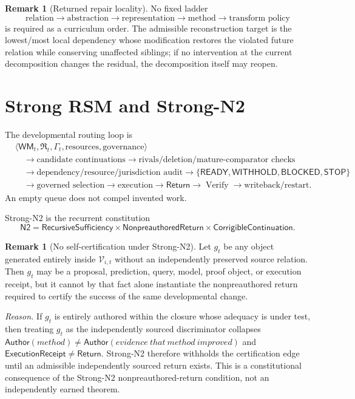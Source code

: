 \documentclass[10pt]{article}
\theoremstyle{venus}
\theoremstyle{definition}
\newtheorem{remark}[theorem]{Remark}
\newcommand{\Verify}{\operatorname{Verify}}
\newcommand{\Ntwo}{\mathsf{N2}}
\newcommand{\WM}{\mathsf{WM}}
\newcommand{\Return}{\mathsf{Return}}
\newcommand{\Author}{\mathsf{Author}}
\newcommand{\Withhold}{\mathsf{WITHHOLD}}
\newcommand{\Stop}{\mathsf{STOP}}
\begin{document}
\begin{remark}[Returned repair locality]
No fixed ladder
\[
\text{relation}\to\text{abstraction}\to\text{representation}\to\text{method}
\to\text{transform policy}
\]
is required as a curriculum order. The admissible reconstruction target is the
lowest/most local dependency whose modification restores the violated future
relation while conserving unaffected siblings; if no intervention at the
current decomposition changes the residual, the decomposition itself may
reopen.
\end{remark}

\section{Strong RSM and Strong-N2}

The developmental routing loop is
\begin{equation}\label{eq:rsm}
\begin{aligned}
&\langle \WM_t,\mathfrak R_t,\Gamma_t,\text{resources},\text{governance}\rangle\\
&\quad\to \text{candidate continuations}
\to \text{rivals/deletion/mature-comparator checks}\\
&\quad\to \text{dependency/resource/jurisdiction audit}
\to \{\mathsf{READY},\Withhold,\mathsf{BLOCKED},\Stop\}\\
&\quad\to \text{governed selection}
\to \text{execution}
\to \Return
\to \Verify
\to \text{writeback/restart}.
\end{aligned}
\end{equation}
An empty queue does not compel invented work.

Strong-N2 is the recurrent constitution
\begin{equation}\label{eq:n2}
\boxed{
\Ntwo
=
\mathsf{RecursiveSufficiency}
\times
\mathsf{NonpreauthoredReturn}
\times
\mathsf{CorrigibleContinuation}.
}
\end{equation}

\begin{remark}[No self-certification under Strong-N2]
Let $g_t$ be any object generated entirely inside $\mathcal V_{i,t}$ without an
independently preserved source relation. Then $g_t$ may be a proposal,
prediction, query, model, proof object, or execution receipt, but it cannot by
that fact alone instantiate the nonpreauthored return required to certify the
success of the same developmental change.
\end{remark}
\textit{Reason.} If $g_t$ is entirely authored within the closure whose adequacy is under test,
then treating $g_t$ as the independently sourced discriminator collapses
\(\Author(method)\neq\Author(evidence\ that\ method\ improved)\) and
\(\mathsf{ExecutionReceipt}\neq\Return\). Strong-N2 therefore withholds the
certification edge until an admissible independently sourced return exists. This is a constitutional consequence of the Strong-N2 nonpreauthored-return condition, not an independently earned theorem.
\end{document}
